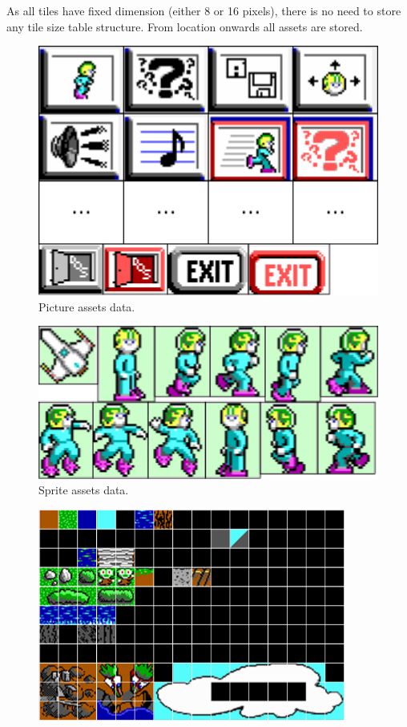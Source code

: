 \documentclass[book.tex]{subfiles}
\begin{document}
As all tiles have fixed dimension (either 8 or 16 pixels), there is no need to store any tile size table structure. From  location onwards all assets are stored.
 
\begin{figure}[H] 
  \centering 
  \includegraphics[width=1.0\textwidth, frame]{screenshots_300dpi/pics_assets.png}
  \caption{Picture assets data.}
  \label{fig:picture_assets}
\end{figure} 

\begin{figure}[H] 
  \centering 
  \includegraphics[width=1.0\textwidth, frame]{screenshots_300dpi/sprite_assets.png}
  \caption{Sprite assets data.}
  \label{fig:sprite_assets}
\end{figure} 

\begin{figure}[H] 
  \centering 
  \includegraphics[width=0.9\textwidth, frame]{screenshots_300dpi/tile16_assets.png}
\end{figure} 
\end{document}
